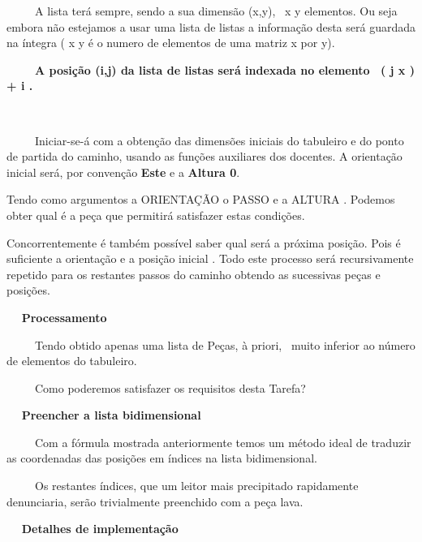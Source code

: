 \documentclass[a4paper]{report} %
\begin{document}
           \par \ \ \ \ \ A lista terá sempre, sendo a sua dimensão (x,y),  x y elementos. Ou seja embora não estejamos a usar uma lista de listas a informação desta será guardada na íntegra ( x y é o numero de elementos de uma matriz x por y). 
           \par \ \ \ \ \ \textbf{A posição (i,j) da lista de listas será indexada no elemento  ( j  x ) + i .}
           \par \ \ \ \ \ 
           \par \ \ \ \ \ Iniciar-se-á com a obtenção das dimensões iniciais do tabuleiro e do ponto de partida do caminho, usando as funções auxiliares dos docentes. A orientação inicial será, por convenção \textbf{Este} e a \textbf{Altura 0}.
           \par Tendo como argumentos a ORIENTAÇÃO o PASSO e a ALTURA . Podemos obter qual é a peça que permitirá satisfazer estas condições.
           \par Concorrentemente é também possível saber qual será a próxima posição. Pois é suficiente a orientação e a posição inicial . Todo este processo será recursivamente repetido para os restantes passos do caminho obtendo as sucessivas peças e posições.
           \par 
           \vspace{1.7mm} 
           \par \ \ \textbf{ Processamento } 
           \par \ \ \ \ \ Tendo obtido apenas uma lista de Peças, à priori,  muito inferior ao número de elementos do tabuleiro. 
           \par \ \ \ \ \ Como poderemos satisfazer os requisitos desta Tarefa?
           \vspace{1.7mm} 
           \par \ \ \textbf{  Preencher a lista bidimensional } 
           \par \ \ \ \ \ Com a fórmula mostrada anteriormente temos um método ideal de traduzir as coordenadas das posições em índices na lista bidimensional. 
           \par \ \ \ \ \ Os restantes índices, que um leitor mais precipitado rapidamente denunciaria, serão trivialmente preenchido com a peça lava. 
           \vspace{1.7mm} 
           \par \ \ \textbf{  Detalhes de implementação } 
\end{document}
